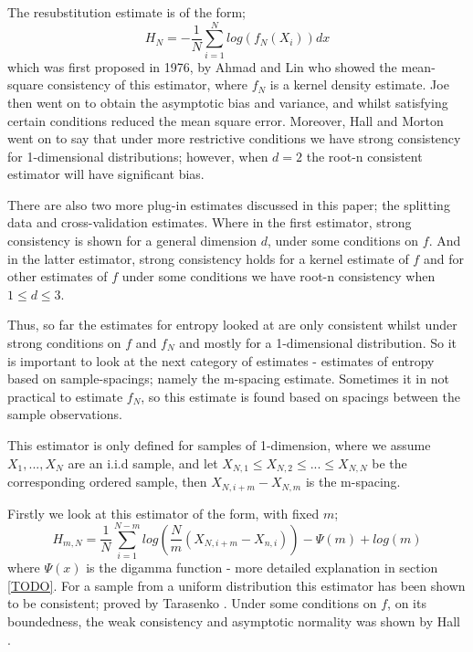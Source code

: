 \documentclass{article}
\begin{document}
The resubstitution estimate is of the form;
\begin{equation}
H_{N} = - \frac{1}{N}\sum_{i=1}^{N}  log ( f_{N}(X_{i}) )dx
\end{equation}
which was first proposed in 1976, by Ahmad and Lin \cite{resest1} who showed the mean-square consistency of this estimator, where  $f_{N}$ is a kernel density estimate. Joe \cite{intest2} then went on to obtain the asymptotic bias and variance, and whilst satisfying certain conditions reduced the mean square error. Moreover, Hall and Morton \cite{resest2} went on to say that under more restrictive conditions we have strong consistency for 1-dimensional distributions; however, when $d=2$ the root-n consistent estimator will have significant bias.

There are also two more plug-in estimates discussed in this paper; the splitting data and cross-validation estimates. Where in the first estimator, strong consistency is shown for a general dimension $d$, under some conditions on $f$. And in the latter estimator, strong consistency holds for a kernel estimate of $f$ and for other estimates of $f$ under some conditions we have root-n consistency when $1 \leq d \leq 3$.

Thus, so far the estimates for entropy looked at are only consistent whilst under strong conditions on $f$ and $f_{N}$ and mostly for a 1-dimensional distribution. So it is important to look at the next category of estimates - estimates of entropy based on sample-spacings; namely the m-spacing estimate. Sometimes it in not practical to estimate $f_{N}$, so this estimate is found based on spacings between the sample observations. 

This estimator is only defined for samples of 1-dimension, where we assume $X_{1}, ..., X_{N}$ are an i.i.d sample, and let $X_{N, 1} \leq X_{N, 2} \leq ... \leq X_{N, N}$ be the corresponding ordered sample, then $X_{N, i+m} - X_{N, m}$ is the m-spacing.

Firstly we look at this estimator of the form, with fixed $m$;
\begin{equation}
H_{m, N} = \frac{1}{N} \sum_{i=1}^{N-m} log \left(\frac{N}{m} (X_{N, i+m} - X_{n, i}) \right) - \Psi(m) + log(m)
\end{equation}
where $\Psi(x)$ is the digamma function - more detailed explanation in section \ref{TODO}. For a sample from a uniform distribution this estimator has been shown to be consistent; proved by Tarasenko \cite{spacest1}. Under some conditions on $f$, on its boundedness, the weak consistency and asymptotic normality was shown by Hall \cite{spacest2}.
\end{document}

